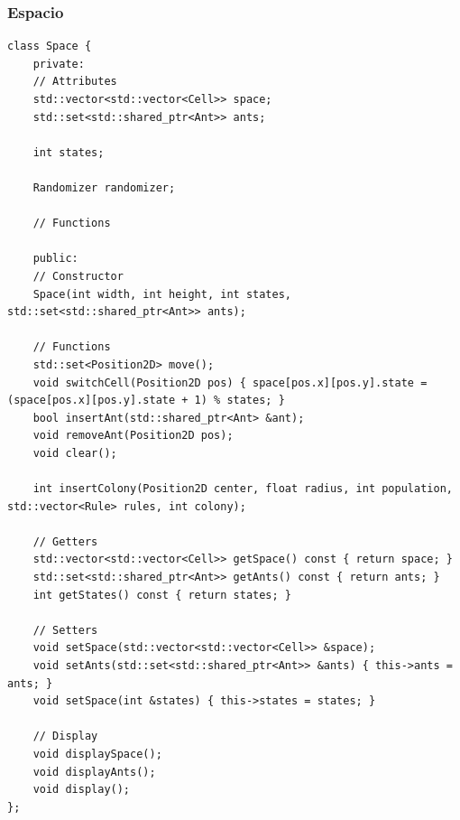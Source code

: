 \documentclass[12pt,twoside]{article}
\begin{document}
\subsubsection{Espacio}

\begin{lstlisting}[caption={Space.hpp}, label={lst:cppexample}]
class Space {
	private:
	// Attributes
	std::vector<std::vector<Cell>> space;
	std::set<std::shared_ptr<Ant>> ants;
	
	int states;
	
	Randomizer randomizer;
	
	// Functions
	
	public:
	// Constructor
	Space(int width, int height, int states, std::set<std::shared_ptr<Ant>> ants);
	
	// Functions
	std::set<Position2D> move();
	void switchCell(Position2D pos) { space[pos.x][pos.y].state = (space[pos.x][pos.y].state + 1) % states; }
	bool insertAnt(std::shared_ptr<Ant> &ant);
	void removeAnt(Position2D pos);
	void clear();
	
	int insertColony(Position2D center, float radius, int population, std::vector<Rule> rules, int colony);
	
	// Getters
	std::vector<std::vector<Cell>> getSpace() const { return space; }
	std::set<std::shared_ptr<Ant>> getAnts() const { return ants; }
	int getStates() const { return states; }
	
	// Setters
	void setSpace(std::vector<std::vector<Cell>> &space);
	void setAnts(std::set<std::shared_ptr<Ant>> &ants) { this->ants = ants; }
	void setSpace(int &states) { this->states = states; }
	
	// Display
	void displaySpace();
	void displayAnts();
	void display();
};
\end{lstlisting}
\end{document}
